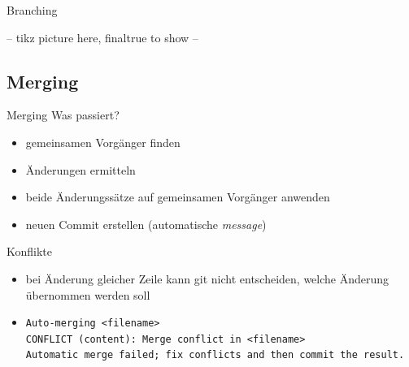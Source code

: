 \documentclass[compress,t]{beamer}
\begin{document}
\begin{frame}{Branching}
{
    }
\else
    -- tikz picture here, finaltrue to show --
\fi
\end{frame}

\subsection{Merging}
\begin{frame}{Merging}
    Was passiert?
    \begin{itemize}
        \item gemeinsamen Vorgänger finden
        \item Änderungen ermitteln
        \item beide Änderungssätze auf gemeinsamen Vorgänger anwenden
        \item neuen Commit erstellen (automatische \emph{message})
    \end{itemize}

    Konflikte
    \begin{itemize}
        \item bei Änderung gleicher Zeile kann git nicht entscheiden, welche
            Änderung übernommen werden soll
        \item
            {\scriptsize
            \texttt{Auto-merging <filename>}\\
            \texttt{CONFLICT (content): Merge conflict in <filename>}\\
            \texttt{Automatic merge failed; fix conflicts and then commit the result.}\\
            }
    \end{itemize}
\end{frame}
\end{document}
